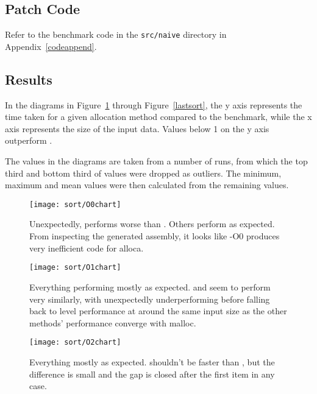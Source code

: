 \subsection{Patch Code}

Refer to the benchmark code in the \texttt{src/naive} directory in Appendix~\ref{codeappend}.

\subsection{Results}

In the diagrams in Figure~\ref{firstsort} through Figure~\ref{lastsort}, the y axis represents the time taken for a given allocation method compared to the  benchmark, while the x axis represents the size of the input data. Values below 1 on the y axis outperform \malloc{}.

The values in the diagrams are taken from a number of runs, from which the top third and bottom third of values were dropped as outliers. The minimum, maximum and mean values were then calculated from the remaining values.

\begin{figure}[ph]
	\centering
	\texttt{[image: sort/O0chart]}
	\caption{Unexpectedly,  performs worse than . Others perform as expected. From inspecting the generated assembly, it looks like -O0 produces very inefficient code for alloca.}\label{firstsort}
\end{figure}

\begin{figure}[ph]
	\centering
	\texttt{[image: sort/O1chart]}
	\caption{Everything performing mostly as expected.  and  seem to perform very similarly, with  unexpectedly underperforming  before falling back to  level performance at around the same input size as the other methods' performance converge with malloc.}
\end{figure}

\begin{figure}[ph]
	\centering
	\texttt{[image: sort/O2chart]}
	\caption{Everything mostly as expected.  shouldn't be faster than , but the difference is small and the gap is closed after the first item in any case.}
\end{figure}

